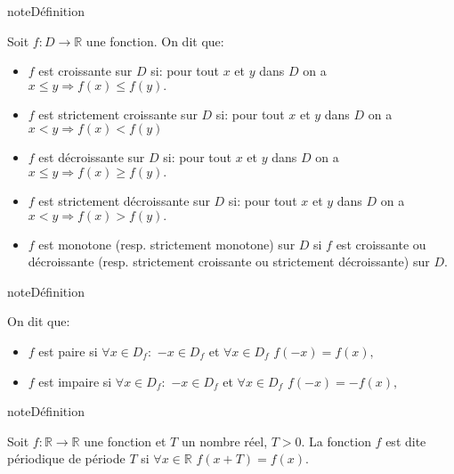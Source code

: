 \documentclass[letterpaper,10pt,french]{jupyterBook}
\begin{document}
\begin{sphinxadmonition}{note}{Définition}

\sphinxAtStartPar
Soit \(f:D\rightarrow \mathbb{R}\) une fonction. On dit que:
\begin{itemize}
\item {} 
\sphinxAtStartPar
\(f\) est croissante sur \(D\) si: pour tout \(x\) et \(y\) dans \(D\) on a \(x\leq y\Rightarrow f(x)\leq f(y).\)

\item {} 
\sphinxAtStartPar
\(f\) est strictement croissante sur \(D\) si: pour tout \(x\) et \(y\) dans \(D\) on a \(x < y\Rightarrow f(x)< f(y)\)

\item {} 
\sphinxAtStartPar
\(f\) est décroissante sur \(D\) si: pour tout \(x\) et \(y\) dans \(D\) on a \(x\leq y\Rightarrow f(x)\geq f(y).\)

\item {} 
\sphinxAtStartPar
\(f\) est strictement décroissante sur \(D\) si: pour tout \(x\) et \(y\) dans \(D\) on a \(x < y\Rightarrow f(x)> f(y).\)

\item {} 
\sphinxAtStartPar
\(f\) est monotone (resp. strictement monotone) sur \(D\) si \(f\) est croissante ou décroissante (resp. strictement croissante ou strictement décroissante) sur \(D.\)

\end{itemize}
\end{sphinxadmonition}

\begin{sphinxadmonition}{note}{Définition}

\sphinxAtStartPar
On dit que:
\begin{itemize}
\item {} 
\sphinxAtStartPar
\(f\) est paire si \(\forall x\in D_f:\) \(-x\in D_f\) et \(\forall x\in D_f\) \(f(-x)=f(x),\)

\item {} 
\sphinxAtStartPar
\(f\) est impaire si \(\forall x\in D_f:\) \(-x\in D_f\) et \(\forall x\in D_f\) \(f(-x)=-f(x),\)

\end{itemize}
\end{sphinxadmonition}

\begin{sphinxadmonition}{note}{Définition}

\sphinxAtStartPar
Soit \(f:\mathbb{R}\rightarrow \mathbb{R}\) une fonction et \(T\) un nombre réel, \(T>0.\) La fonction \(f\) est dite périodique de période \(T\) si \(\forall x\in \mathbb{R}\) \(f(x+T)=f(x).\)
\end{sphinxadmonition}
\end{document}

